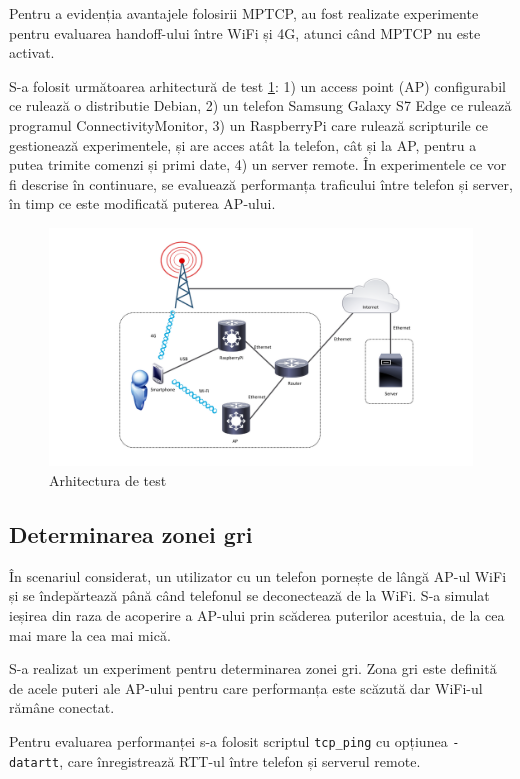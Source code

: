 Pentru a evidenția avantajele folosirii MPTCP, au fost realizate experimente pentru evaluarea handoff-ului între WiFi și 4G, atunci când MPTCP nu este activat.

S-a folosit următoarea arhitectură de test \ref{fig:topologie}: 1) un access point (AP) configurabil ce rulează o distributie Debian, 2) un telefon Samsung Galaxy S7 Edge ce rulează programul ConnectivityMonitor, 3) un RaspberryPi care rulează scripturile ce gestionează experimentele, și are acces atât la telefon, cât și la AP, pentru a putea trimite comenzi și primi date, 4) un server remote. În experimentele ce vor fi descrise în continuare, se evaluează performanța traficului între telefon și server, în timp ce este modificată puterea AP-ului. 

\begin{figure}[h!]
 	\includegraphics[scale=0.45]{figures/experiments/45G_Topology.pdf} 
	\caption{Arhitectura de test}
	\label{fig:topologie}
\end{figure}

\subsection{Determinarea zonei gri}

În scenariul considerat, un utilizator cu un telefon pornește de lângă AP-ul WiFi și se îndepărtează până când telefonul se deconectează de la WiFi. S-a simulat ieșirea din raza de acoperire a AP-ului prin scăderea puterilor acestuia, de la cea mai mare la cea mai mică. 

S-a realizat un experiment pentru determinarea zonei gri. Zona gri este definită de acele puteri ale AP-ului pentru care performanța este scăzută dar WiFi-ul rămâne conectat. 

Pentru evaluarea performanței s-a folosit scriptul \texttt{tcp\_ping} cu opțiunea \texttt{-datartt}, care înregistrează RTT-ul între telefon și serverul remote. 

